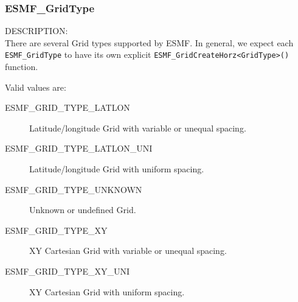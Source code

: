  \subsubsection{ESMF\_GridType}
 
 {\sf DESCRIPTION:\\}
 There are several Grid types supported by ESMF.  In general, we expect each
 {\tt ESMF\_GridType} to have its own explicit 
 {\tt ESMF\_GridCreateHorz<GridType>()} function.
 
 Valid values are:
 \begin{description}
    \item [ESMF\_GRID\_TYPE\_LATLON]
          Latitude/longitude Grid with variable or unequal spacing.
 
    \item [ESMF\_GRID\_TYPE\_LATLON\_UNI]
          Latitude/longitude Grid with uniform spacing.
 
    \item [ESMF\_GRID\_TYPE\_UNKNOWN]
          Unknown or undefined Grid.

    \item [ESMF\_GRID\_TYPE\_XY]
          XY Cartesian Grid with variable or unequal spacing.
 
    \item [ESMF\_GRID\_TYPE\_XY\_UNI]
          XY Cartesian Grid with uniform spacing.
 
 \end{description}


